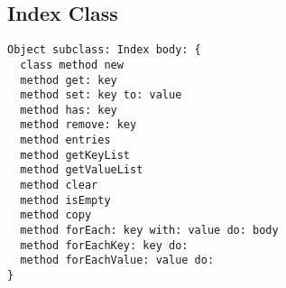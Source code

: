 \subsection {Index Class}

\begin{lstlisting}
Object subclass: Index body: {
  class method new
  method get: key
  method set: key to: value
  method has: key
  method remove: key
  method entries
  method getKeyList
  method getValueList
  method clear
  method isEmpty
  method copy
  method forEach: key with: value do: body
  method forEachKey: key do:
  method forEachValue: value do:
}
\end{lstlisting}
